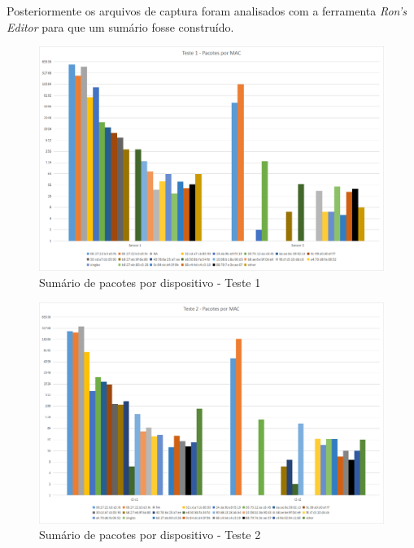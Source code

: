 Posteriormente os arquivos de captura foram analisados com a ferramenta
\emph{Ron’s Editor} para que um sumário fosse construído.

\clearpage
\begin{figure}[ht]
	\centering
	\caption{\label{fig-mg4-noise-t1}Sumário de pacotes por dispositivo - Teste 1}
	\includegraphics[height=0.32\textheight,width=1\textwidth]{060-testes/data-analisis/distance-mg4plus-netflix/Teste1.png}
\end{figure}

\begin{figure}[hb]
	\centering
	\caption{\label{fig-mg4-noise-t2}Sumário de pacotes por dispositivo - Teste 2}
	\includegraphics[height=0.32\textheight,width=1\textwidth]{060-testes/data-analisis/distance-mg4plus-netflix/Teste2.png}
\end{figure}

